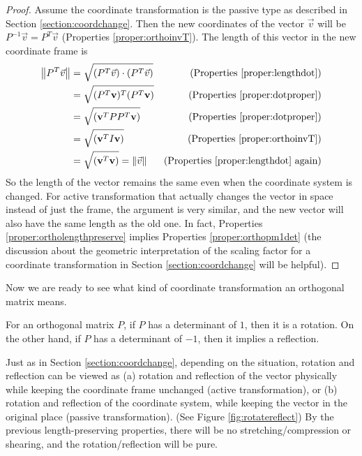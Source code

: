\begin{proof}
Assume the coordinate transformation is the passive type as described in Section \ref{section:coordchange}. Then the new coordinates of the vector $\vec{v}$ will be $P^{-1}\vec{v} = P^T\vec{v}$ (Properties \ref{proper:orthoinvT}). The length of this vector in the new coordinate frame is
\begin{align*}
\norm{P^T\vec{v}} &= \sqrt{(P^T\vec{v})\cdot(P^T\vec{v})} & \text{(Properties \ref{proper:lengthdot})} \\
&= \sqrt{(P^T\textbf{v})^T(P^T\textbf{v})} & \text{(Properties \ref{proper:dotproper})}\\
&= \sqrt{(\textbf{v}^T PP^T \textbf{v})} & \text{(Properties \ref{proper:dotproper})} \\
&= \sqrt{(\textbf{v}^T I \textbf{v})} & \text{(Properties \ref{proper:orthoinvT})} \\
&= \sqrt{(\textbf{v}^T\textbf{v})} = \norm{\vec{v}} & \text{(Properties \ref{proper:lengthdot} again)}
\end{align*}
So the length of the vector remains the same even when the coordinate system is changed. For active transformation that actually changes the vector in space instead of just the frame, the argument is very similar, and the new vector will also have the same length as the old one. In fact, Properties \ref{proper:ortholengthpreserve} implies Properties \ref{proper:orthopm1det} (the discussion about the geometric interpretation of the scaling factor for a coordinate transformation in Section \ref{section:coordchange} will be helpful).
\end{proof}

Now we are ready to see what kind of coordinate transformation an orthogonal matrix means.
\begin{thm}
\label{thm:orthodet}
For an orthogonal matrix $P$, if $P$ has a determinant of $1$, then it is a rotation. On the other hand, if $P$ has a determinant of $-1$, then it implies a reflection.
\end{thm}
Just as in Section \ref{section:coordchange}, depending on the situation, rotation and reflection can be viewed as (a) rotation and reflection of the vector physically while keeping the coordinate frame unchanged (active transformation), or (b) rotation and reflection of the coordinate system, while keeping the vector in the original place (passive transformation). (See Figure \ref{fig:rotatereflect}) By the previous length-preserving properties, there will be no stretching/compression or shearing, and the rotation/reflection will be pure.

